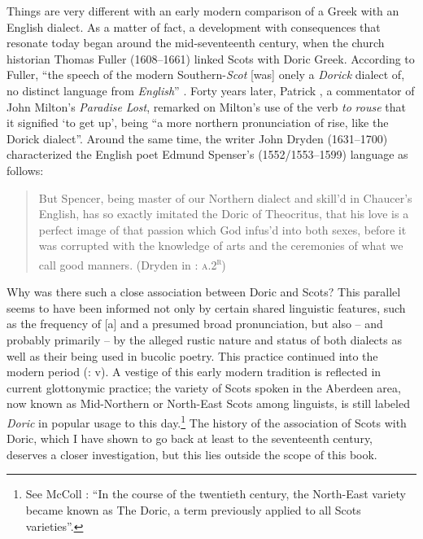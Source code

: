 \documentclass[output=paper]{langsci/langscibook}
\begin{document}
Things are very different with an early modern comparison of a Greek with an English dialect. As a matter of fact, a development with consequences that resonate today began around the mid-seventeenth century, when the church historian Thomas Fuller (1608–1661) linked Scots with Doric Greek. According to Fuller, “the speech of the modern Southern-\textit{Scot} [was] onely a \textit{Dorick} dialect of, no distinct language from \textit{English}” \citep[81]{Fuller1655}. Forty years later, Patrick \citet[20]{Hume1695}, a commentator of John Milton’s \textit{Paradise} \textit{Lost}, remarked on Milton’s use of the verb \textit{to} \textit{rouse} that it signified ‘to get up’, being “a more northern pronunciation of rise, like the Dorick dialect”. Around the same time, the writer John Dryden (1631–1700) characterized the English poet Edmund Spenser’s (1552/1553–1599) language as follows:

\begin{quote}
But Spencer, being master of our Northern dialect and skill’d in Chaucer’s English, has so exactly imitated the Doric of Theocritus, that his love is a perfect image of that passion which God infus’d into both sexes, before it was corrupted with the knowledge of arts and the ceremonies of what we call good manners. (Dryden in \citealt{Vergil1697}: \textsc{a.2}\textsc{\textsuperscript{r}})
\end{quote}

Why was there such a close association between Doric and Scots? This parallel seems to have been informed not only by certain shared linguistic features, such as the frequency of [a] and a presumed broad pronunciation, but also – and probably primarily – by the alleged rustic nature and status of both dialects as well as their being used in bucolic poetry. This practice continued into the modern period (\citealt{Colvin1999}: v). A vestige of this early modern tradition is reflected in current glottonymic practice; the variety of Scots spoken in the Aberdeen area, now known as Mid-Northern or North-East Scots among linguists, is still labeled \textit{Doric} in popular usage to this day.\footnote{See McColl \citet[116]{Millar2007}: “In the course of the twentieth century, the North-East variety became known as The Doric, a term previously applied to all Scots varieties”.} The history of the association of Scots with Doric, which I have shown to go back at least to the seventeenth century, deserves a closer investigation, but this lies outside the scope of this book.
\end{document}

